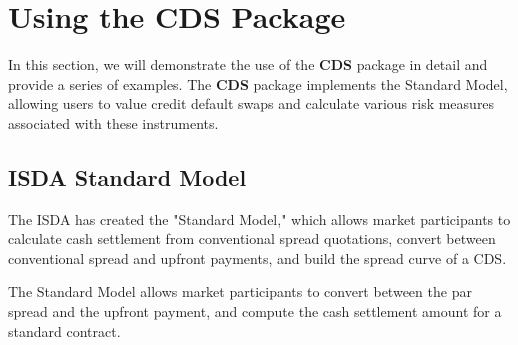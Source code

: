 \documentclass[article]{jss}
\begin{document}


\newpage
\section{Using the CDS Package}
\label{CDSpkg}

In this section, we will demonstrate the use of the \textbf{CDS} package in detail and provide a series of examples. The \textbf{CDS} package implements the Standard Model, allowing users to value credit default swaps and calculate various risk measures associated with these instruments. 

\subsection{ISDA Standard Model}
\label{sec:ISDAStMod}

The ISDA has created the "Standard Model," which allows market participants to calculate cash settlement from conventional spread quotations, convert between conventional spread and upfront payments, and build the spread curve of a CDS. 

The Standard Model allows market participants to convert between the par spread and the upfront payment, and compute the cash settlement amount for a standard contract.
\end{document}
